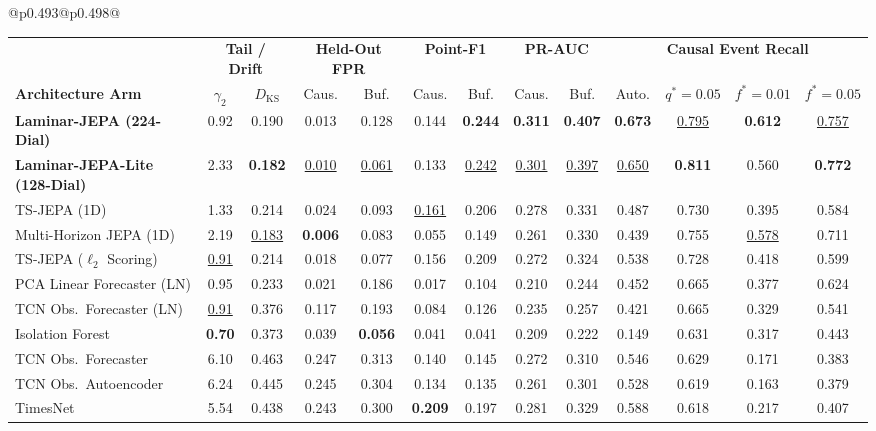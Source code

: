 \documentclass[journal]{IEEEtran}
\begin{document}
\begin{table}[t]
\begin{tabular}{@{}p{}@{\hspace{0.009\textwidth}}p{}@{}}
{\begin{tabular*}{0.992\textwidth}{@{\extracolsep{\fill}}l cc cc cc cc cccc@{}}
\toprule
& \multicolumn{2}{c}{\textbf{Tail / Drift}} & \multicolumn{2}{c}{\textbf{Held-Out FPR}} & \multicolumn{2}{c}{\textbf{Point-F1}} & \multicolumn{2}{c}{\textbf{PR-AUC}} & \multicolumn{4}{c}{\textbf{Causal Event Recall}} \\
\cmidrule(lr){2-3} \cmidrule(lr){4-5} \cmidrule(lr){6-7} \cmidrule(lr){8-9} \cmidrule(lr){10-13}
\textbf{Architecture Arm} & $\gamma_2$ & $D_{\text{KS}}$ & Caus. & Buf. & Caus. & Buf. & Caus. & Buf. & Auto. & $q^*{=}0.05$ & $f^*{=}0.01$ & $f^*{=}0.05$ \\
\midrule
\textbf{Laminar-JEPA (224-Dial)} & 0.92 & 0.190 & 0.013 & 0.128 & 0.144 & \textbf{0.244} & \textbf{0.311} & \textbf{0.407} & \textbf{0.673} & \underline{0.795} & \textbf{0.612} & \underline{0.757} \\
\textbf{Laminar-JEPA-Lite (128-Dial)} & 2.33 & \textbf{0.182} & \underline{0.010} & \underline{0.061} & 0.133 & \underline{0.242} & \underline{0.301} & \underline{0.397} & \underline{0.650} & \textbf{0.811} & 0.560 & \textbf{0.772} \\
TS-JEPA (1D) & 1.33 & 0.214 & 0.024 & 0.093 & \underline{0.161} & 0.206 & 0.278 & 0.331 & 0.487 & 0.730 & 0.395 & 0.584 \\
Multi-Horizon JEPA (1D) & 2.19 & \underline{0.183} & \textbf{0.006} & 0.083 & 0.055 & 0.149 & 0.261 & 0.330 & 0.439 & 0.755 & \underline{0.578} & 0.711 \\
TS-JEPA ($\ell_2$ Scoring) & \underline{0.91} & 0.214 & 0.018 & 0.077 & 0.156 & 0.209 & 0.272 & 0.324 & 0.538 & 0.728 & 0.418 & 0.599 \\
\addlinespace[1.5pt]
PCA Linear Forecaster (LN) & 0.95 & 0.233 & 0.021 & 0.186 & 0.017 & 0.104 & 0.210 & 0.244 & 0.452 & 0.665 & 0.377 & 0.624 \\
TCN Obs.\ Forecaster (LN) & \underline{0.91} & 0.376 & 0.117 & 0.193 & 0.084 & 0.126 & 0.235 & 0.257 & 0.421 & 0.665 & 0.329 & 0.541 \\
Isolation Forest & \textbf{0.70} & 0.373 & 0.039 & \textbf{0.056} & 0.041 & 0.041 & 0.209 & 0.222 & 0.149 & 0.631 & 0.317 & 0.443 \\
\addlinespace[1.5pt]
TCN Obs.\ Forecaster & 6.10 & 0.463 & 0.247 & 0.313 & 0.140 & 0.145 & 0.272 & 0.310 & 0.546 & 0.629 & 0.171 & 0.383 \\
TCN Obs.\ Autoencoder & 6.24 & 0.445 & 0.245 & 0.304 & 0.134 & 0.135 & 0.261 & 0.301 & 0.528 & 0.619 & 0.163 & 0.379 \\
TimesNet & 5.54 & 0.438 & 0.243 & 0.300 & \textbf{0.209} & 0.197 & 0.281 & 0.329 & 0.588 & 0.618 & 0.217 & 0.407 \\

\end{tabular*}}
\end{tabular}
\end{table}
\end{document}
